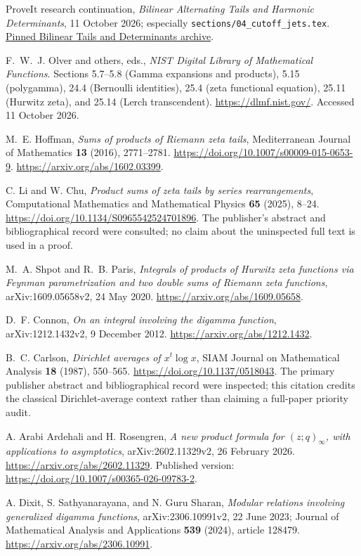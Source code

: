 ProveIt research continuation,
\emph{Bilinear Alternating Tails and Harmonic Determinants},
11 October 2026; especially
\texttt{sections/04\_cutoff\_jets.tex}.
\href{https://github.com/VladimirReshetnikov/ProveIt/blob/36edefa8c531d9d6df8306ac51bcc317250f404c/docs/incoming/ProveIt_Bilinear_Tails_and_Determinants_2026-10-11.zip}{Pinned Bilinear Tails and Determinants archive}.

F.~W.~J. Olver and others, eds.,
\emph{NIST Digital Library of Mathematical Functions}.
Sections 5.7--5.8 (Gamma expansions and products), 5.15 (polygamma),
24.4 (Bernoulli identities), 25.4 (zeta functional equation),
25.11 (Hurwitz zeta), and 25.14 (Lerch transcendent).
\url{https://dlmf.nist.gov/}.
Accessed 11 October 2026.

M.~E. Hoffman,
\emph{Sums of products of Riemann zeta tails},
Mediterranean Journal of Mathematics \textbf{13} (2016), 2771--2781.
\url{https://doi.org/10.1007/s00009-015-0653-9}.
\url{https://arxiv.org/abs/1602.03399}.

C. Li and W. Chu,
\emph{Product sums of zeta tails by series rearrangements},
Computational Mathematics and Mathematical Physics
\textbf{65} (2025), 8--24.
\url{https://doi.org/10.1134/S0965542524701896}.
The publisher's abstract and bibliographical record were consulted;
no claim about the uninspected full text is used in a proof.

M.~A. Shpot and R.~B. Paris,
\emph{Integrals of products of Hurwitz zeta functions via Feynman
parametrization and two double sums of Riemann zeta functions},
arXiv:1609.05658v2, 24 May 2020.
\url{https://arxiv.org/abs/1609.05658}.

D.~F. Connon,
\emph{On an integral involving the digamma function},
arXiv:1212.1432v2, 9 December 2012.
\url{https://arxiv.org/abs/1212.1432}.

B.~C. Carlson,
\emph{Dirichlet averages of \(x^t\log x\)},
SIAM Journal on Mathematical Analysis \textbf{18} (1987), 550--565.
\url{https://doi.org/10.1137/0518043}.
The primary publisher abstract and bibliographical record were
inspected; this citation credits the classical Dirichlet-average
context rather than claiming a full-paper priority audit.

A. Arabi Ardehali and H. Rosengren,
\emph{A new product formula for \((z;q)_\infty\),
with applications to asymptotics},
arXiv:2602.11329v2, 26 February 2026.
\url{https://arxiv.org/abs/2602.11329}.
Published version:
\url{https://doi.org/10.1007/s00365-026-09783-2}.

A. Dixit, S. Sathyanarayana, and N. Guru Sharan,
\emph{Modular relations involving generalized digamma functions},
arXiv:2306.10991v2, 22 June 2023;
Journal of Mathematical Analysis and Applications
\textbf{539} (2024), article 128479.
\url{https://arxiv.org/abs/2306.10991}.

